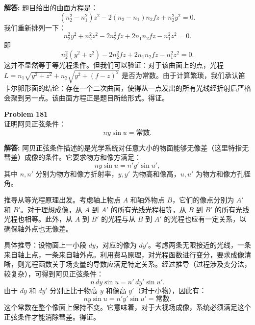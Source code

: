 \documentclass[12pt, a4paper, oneside]{ctexart}
\newenvironment{solution}{\par\noindent\textbf{解答:}\quad}{\par}
\begin{document}
\begin{solution}
    题目给出的曲面方程是：
    \[
    (n_2^2 - n_1^2) z^2 - 2(n_2 - n_1) n_2 f z + n_2^2 y^2 = 0.
    \]
    我们重新排列一下：
    \[
    n_2^2 y^2 + n_2^2 z^2 - 2 n_2^2 f z + 2 n_1 n_2 f z - n_1^2 z^2 = 0.
    \]
    即
    \[
    n_2^2 (y^2 + z^2) - 2 n_2^2 f z + 2 n_1 n_2 f z - n_1^2 z^2 = 0.
    \]
    这并不显然等于等光程条件。但我们可以验证：对于该曲面上的点，光程 $L = n_1 \sqrt{y^2+z^2} + n_2 \sqrt{y^2+(f-z)^2}$ 是否为常数。由于计算繁琐，我们承认笛卡尔卵形面的结论：存在一个二次曲面，使得从一点发出的所有光线经折射后严格会聚到另一点。该曲面方程正是题目所给形式。得证。
\end{solution}
\begin{mdframed}[backgroundcolor=gray!10, linewidth=0pt]
    \textbf{Problem 181} \\
    证明阿贝正弦条件：
    \[
    n y \sin u = \text{常数}.
    \]
\end{mdframed}
\begin{solution}
    阿贝正弦条件描述的是光学系统对任意大小的物面能够无像差（这里特指无彗差）成像的条件。它要求物方和像方满足：
    \[
    n y \sin u = n' y' \sin u',
    \]
    其中 $n, n'$ 分别为物方和像方折射率，$y, y'$ 为物高和像高，$u, u'$ 为物方和像方孔径角。

    推导从等光程原理出发。考虑轴上物点 $A$ 和轴外物点 $B$，它们的像点分别为 $A'$ 和 $B'$。对于理想成像，从 $A$ 到 $A'$ 的所有光线光程相等，从 $B$ 到 $B'$ 的所有光线光程也相等。此外，从 $A$ 到 $B'$ 的光程与从 $B$ 到 $A'$ 的光程也应有一定关系，以确保轴外点也无像差。

    具体推导：设物面上一小段 $dy$，对应的像为 $dy'$。考虑两条无限接近的光线，一条来自轴上点，一条来自轴外点。利用费马原理，对光程函数进行变分，要求成像清晰，则光程函数关于场变量的导数应满足特定关系。经过推导（过程涉及变分法，较复杂），可得到阿贝正弦条件：
    \[
    n \, dy \sin u = n' \, dy' \sin u'.
    \]
    由于 $dy$ 和 $dy'$ 分别正比于物高 $y$ 和像高 $y'$（对于小物），因此有：
    \[
    n y \sin u = n' y' \sin u' = \text{常数}.
    \]
    这个常数在整个像面上保持不变。它意味着，对于大视场成像，系统必须满足这个正弦条件才能消除彗差。得证。
\end{solution}
\end{document}
